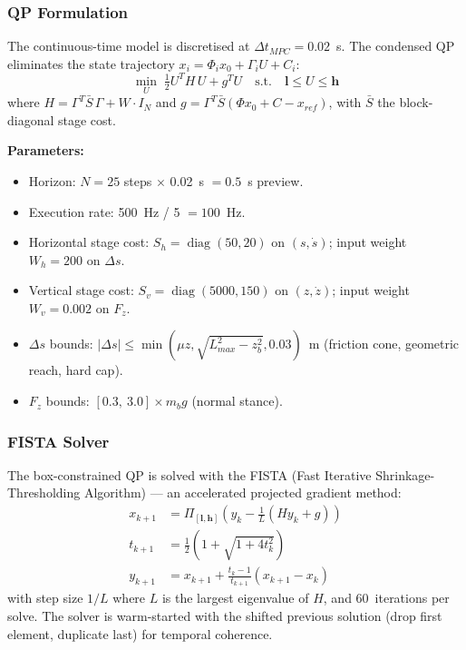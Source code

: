 \documentclass[11pt,a4paper]{article}
\begin{document}
\subsubsection{QP Formulation}

The continuous-time model is discretised at $\Delta t_{MPC} = 0.02$~s.  The condensed QP
eliminates the state trajectory $x_i = \Phi_i x_0 + \Gamma_i U + C_i$:
\begin{equation}
    \min_U \; \tfrac{1}{2}U^T H\,U + g^T U \quad \text{s.t.} \quad
    \bm{l} \leq U \leq \bm{h}
\end{equation}
where $H = \Gamma^T \bar{S}\,\Gamma + W\cdot I_N$ and
$g = \Gamma^T \bar{S}(\Phi x_0 + C - x_{ref})$, with $\bar{S}$ the block-diagonal stage
cost.

\textbf{Parameters:}
\begin{itemize}[leftmargin=*]
    \item Horizon: $N = 25$ steps $\times$ 0.02~s $= 0.5$~s preview.
    \item Execution rate: 500~Hz / 5 $= 100$~Hz.
    \item Horizontal stage cost: $S_h = \operatorname{diag}(50, 20)$ on $(s, \dot{s})$;
          input weight $W_h = 200$ on $\Delta s$.
    \item Vertical stage cost: $S_v = \operatorname{diag}(5000, 150)$ on $(z, \dot{z})$;
          input weight $W_v = 0.002$ on $F_z$.
    \item $\Delta s$ bounds: $|\Delta s| \leq \min(\mu z,
          \sqrt{L_{max}^2 - z_b^2}, 0.03)$~m (friction cone, geometric reach, hard cap).
    \item $F_z$ bounds: $[0.3,\ 3.0] \times m_b g$ (normal stance).
\end{itemize}

\subsubsection{FISTA Solver}

The box-constrained QP is solved with the FISTA (Fast Iterative Shrinkage-Thresholding
Algorithm) --- an accelerated projected gradient method:
\begin{align}
    x_{k+1} &= \Pi_{[\bm{l},\bm{h}]}(y_k - \tfrac{1}{L}(Hy_k + g)) \\
    t_{k+1} &= \tfrac{1}{2}(1 + \sqrt{1 + 4t_k^2}) \\
    y_{k+1} &= x_{k+1} + \tfrac{t_k - 1}{t_{k+1}}(x_{k+1} - x_k)
\end{align}
with step size $1/L$ where $L$ is the largest eigenvalue of $H$, and 60~iterations per
solve.  The solver is warm-started with the shifted previous solution (drop first element,
duplicate last) for temporal coherence.
\end{document}
